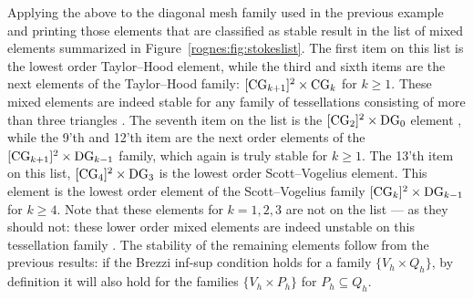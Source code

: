 Applying the above to the diagonal mesh family used in the previous
example and printing those elements that are classified as stable
result in the list of mixed elements summarized in
Figure~\ref{rognes:fig:stokeslist}. The first item on this list is the
lowest order Taylor--Hood element, while the third and sixth items are
the next elements of the Taylor--Hood family:
$[\mathrm{CG}_{k+1}]^{2} \times \mathrm{CG}_{k}$ for $k \geqslant
1$. These mixed elements are indeed stable for any family of
tessellations consisting of more than three
triangles \citep{TaylorHood1973, Stenberg1984, BrezziFalk1991}. The
seventh item on the list is the
$[\mathrm{CG}_{2}]^{2} \times \mathrm{DG}_{0}$
element \citep{CrouzeixRaviart1973}, while the 9'th and 12'th item are
the next order elements of the $[\mathrm{CG}_{k+1}]^{2} \times
\mathrm{DG}_{k-1}$ family, which again is truly stable for $k \geqslant
1$. The 13'th item on this list, $[\mathrm{CG}_{4}]^{2} \times
\mathrm{DG}_{3}$ is the lowest order Scott--Vogelius element. This element
is the lowest order element of the Scott--Vogelius family
$[\mathrm{CG}_{k}]^{2} \times \mathrm{DG}_{k-1}$ for $k \geqslant
4$. Note that these elements for $k = 1, 2, 3$ are not on the list ---
as they should not: these lower order mixed elements are indeed
unstable on this tessellation family \citep{Qin1994}. The stability of
the remaining elements follow from the previous results: if the Brezzi
inf-sup condition holds for a family $\{V_h \times Q_h\}$, by
definition it will also hold for the families $\{V_h \times P_h\}$ for
$P_h \subseteq Q_h$.
